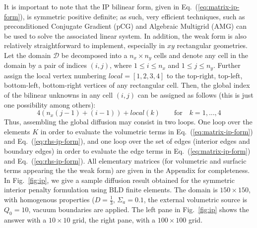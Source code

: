 \documentclass{mc2013}
\newcommand\mc{\mathcal}
\renewcommand{\(}{\left(}
\renewcommand{\)}{\right)}
\renewcommand{\[}{\left[}
\renewcommand{\]}{\right]}
\newcommand{\eqt}[1]{Eq.~(\ref{#1})}                     %
\newcommand{\fig}[1]{Fig.~\ref{#1}}                      %
\begin{document}
It is important to note that the IP bilinear form, given in \eqt{eq:matrix-ip-form}, is symmetric positive definite; 
as such, very efficient techniques, such as preconditioned Conjugate Gradient (pCG) and Algebraic Multigrid (AMG) can
be used to solve the associated linear system. In addition, the weak form is also relatively straightforward to implement,
especially in $xy$ rectangular geometries. Let the domain $\mc{D}$ be decomposed into a $n_x \times n_y$ cells 
and denote any cell in the domain by a pair of indices $(i,j)$, where 
$1 \le i \le n_x$ and $1 \le j \le n_y$. Further assign the local vertex numbering $local=[1,2,3,4]$ to the
top-right, top-left, bottom-left, bottom-right vertices of any rectangular cell. Then, the global index of
the bilinear unknowns in any cell $(i,j)$ can be assigned as follows (this is just one possibility among others):
\begin{equation}
4\left( n_x(j-1)+(i-1) \right) +local(k) \qquad \text{for} \quad k =1, ..., 4
\end{equation}
Thus, assembling the global diffusion may consist in two loops. One loop over the elements $K$ in order to evaluate 
the volumetric terms in \eqt{eq:matrix-ip-form} and \eqt{eq:rhs-ip-form}, and one loop over the set of edges 
(interior edges and boundary edges) in order to evaluate the edge terms in \eqt{eq:matrix-ip-form} and \eqt{eq:rhs-ip-form}.
All elementary matrices (for volumetric and surfacic terms appearing the the weak form) are 
given in the Appendix for completeness.\\
%
In \fig{fig:ip}, we give a sample diffusion result obtained for the symmetric interior penalty formulation using BLD finite elements. The domain is 
$150 \times 150$, with homogenous properties ($D=\tfrac 1 3$, $\Sigma_a=0.1$, the external volumetric source is $Q_0=10$, vacuum boundaries are applied.
The left pane in \fig{fig:ip} shows the answer with a $10\times 10$ grid, the right pane, with a $100 \times 100$ grid.
\end{document}
